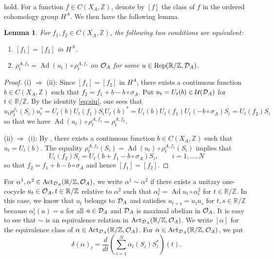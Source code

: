 \documentclass[11pt]{article}
\newtheorem{lemma}[theorem]{Lemma}
\theoremstyle{plain}
\theoremstyle{definition}
\numberwithin{equation}{section}
\renewcommand{\labelenumi}{\textup{(\theenumi)}}
\newcommand{\Ad}{\operatorname{Ad}}
\newcommand{\RZ}{\mathbb{R}/{\mathbb{Z}}}
\newcommand{\Z}{\mathbb{Z}}
\begin{document}
hold.
For a function $f \in C(X_A,\Z)$, 
denote by $[f]$ the class of $f$ in the ordered cohomology group
$H^A$. 
We then have the following lemma. 
\begin{lemma} \label{lem:HA}
For $f_1, f_2 \in C(X_A,\Z)$,
the following two conditions are equivalent:
\begin{enumerate}
\renewcommand{\theenumi}{\roman{enumi}}
\renewcommand{\labelenumi}{\textup{(\theenumi)}}
\item
$[f_1] = [f_2]$ in $H^A$.
\item
$\rho_t^{A,f_2} = \Ad(u_t) \circ \rho_t^{A,f_1}$ on ${{\mathcal{O}}_A}$
for some $u \in {{\operatorname{Rep}(\mathbb{R}/{\mathbb{Z}},{{\mathcal{D}}_A})}}$.
\end{enumerate}
\end{lemma}
\begin{proof}
(i) $\Rightarrow$ (ii):
Since $[f_1] = [f_2]$ in $H^A$,
there exists a continuous function $b \in C(X_A,\Z)$ such that
$f_2 = f_1 + b- b\circ \sigma_A$.
Put
$u_t = U_t(b) \in {{{\mathcal{U}}}}({{\mathcal{D}}_A})$ for $t \in \RZ$.
By the identity \eqref{eq:siu}, one sees that
\begin{equation*}
u_t \rho_t^{f_1}(S_i) u_t^*
 = U_t(b) U_t(f_1) S_i U_t(b)^* 
 = U_t(b) U_t(f_1) U_t(-b \circ \sigma_A) S_i 
  = U_t(f_2) S_i 
\end{equation*} 
so that
we have
$\Ad(u_t) \circ \rho_t^{A,f_1} = \rho_t^{A,f_2}$.

(ii) $\Rightarrow$ (i):
By \cite[Lemma 6.4]{MaPre2014},
there exists a continuous function
$b \in C(X_A,\Z)$ 
such that 
$u_t = U_t(b)$. 
The equality
$\rho_t^{A,f_2}(S_i) = \Ad(u_t) \circ \rho_t^{A,f_1}(S_i) $
implies that
\begin{equation*}
U_t(f_2) S_i
= U_t(b + f_1 - b\circ \sigma_A) S_i, \qquad i=1,\dots,N 
\end{equation*}
so that
$f_2 = f_1 + b- b\circ \sigma_A$
and hence
$[f_1] = [f_2]$.
\end{proof}
For
$\alpha^1, \alpha^2 \in {{\operatorname{Act}_{{{\mathcal{D}}_A}}(\mathbb{R}/{\mathbb{Z}},{{\mathcal{O}}_A})}}$,
we write
$\alpha^1\sim \alpha^2$
if there exists a unitary one-cocycle 
$u_t  \in \OA, t \in \RZ$
relative to $\alpha^2$
such that
$\alpha^1_t = \Ad u_t \circ \alpha^2_t$
for $t \in \RZ$.
In this case, we know that 
$u_t$ belongs to ${{\mathcal{D}}_A}$
and satisfies
$u_{t+s} = u_t u_s$ for $t,s \in \RZ$
because $\alpha^i_t(a) =a$ for all $a \in {{\mathcal{D}}_A}$
and ${{\mathcal{D}}_A}$ is maximal abelian in ${{\mathcal{O}}_A}$.
It is easy to see that 
$\sim$ is an equivalence relation in ${{\operatorname{Act}_{{{\mathcal{D}}_A}}(\mathbb{R}/{\mathbb{Z}},{{\mathcal{O}}_A})}}$.
We write
$[\alpha]$ for the equivalence class of $\alpha \in {{\operatorname{Act}_{{{\mathcal{D}}_A}}(\mathbb{R}/{\mathbb{Z}},{{\mathcal{O}}_A})}}$. 
For $\alpha \in {{\operatorname{Act}_{{{\mathcal{D}}_A}}(\mathbb{R}/{\mathbb{Z}},{{\mathcal{O}}_A})}}$, we put
\begin{equation*}
\delta(\alpha)_t = \frac{d}{dt}\left(\sum_{i=1}^N \alpha_t(S_i)S_i^*\right)(t).
\end{equation*}
\end{document}
